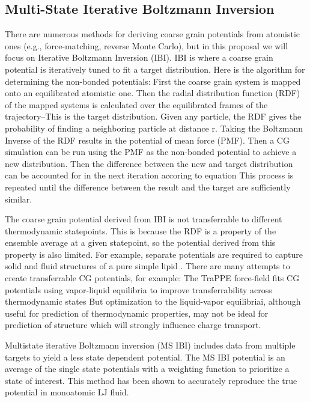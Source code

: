 
\subsection*{Multi-State Iterative Boltzmann Inversion}

There are numerous methods for deriving coarse grain potentials from atomistic ones (e.g., force-matching, reverse Monte Carlo), but in this proposal we will focus on Iterative Boltzmann Inversion (IBI).
IBI is where a coarse grain potential is iteratively tuned to fit a target distribution. \cite{Reith2003a}
Here is the algorithm for determining the non-bonded potentials:
First the coarse grain system is mapped onto an equilibrated atomistic one.
Then the radial distribution function (RDF) of the mapped systems is calculated over the equilibrated frames of the trajectory--This is the target distribution.
Given any particle, the RDF gives the probability of finding a neighboring particle at distance r.
Taking the Boltzmann Inverse of the RDF results in the potential of mean force (PMF). %
Then a CG simulation can be run using the PMF as the non-bonded potential to achieve a new distribution.
Then the difference between the new and target distribution can be accounted for in the next iteration accoring to equation %
This process is repeated until the difference between the result and the target are sufficiently similar.

The coarse grain potential derived from IBI is not transferrable to different thermodynamic statepoints.
This is because the RDF is a property of the ensemble average at a given statepoint, so the potential derived from this property is also limited.
For example, separate potentials are required to capture solid and fluid structures of a pure simple lipid \cite{Hadley2010a}.
There are many attempts to create transferrable CG potentials, for example:
The TraPPE force-field fits CG potentials using vapor-liquid equilibria to improve transferrability across thermodynamic states\cite{Maerzke2011}
But optimization to the liquid-vapor equilibriai, although useful for prediction of thermodynamic properties, may not be ideal for prediction of structure which will strongly influence charge transport.

Multistate iterative Boltzmann inversion (MS IBI) includes data from multiple targets to yield a less state dependent potential.\cite{Moore2014}
The MS IBI potential is an average of the single state potentials with a weighting function to prioritize a state of interest.
This method has been shown to accurately reproduce the true potential in monoatomic LJ fluid.

